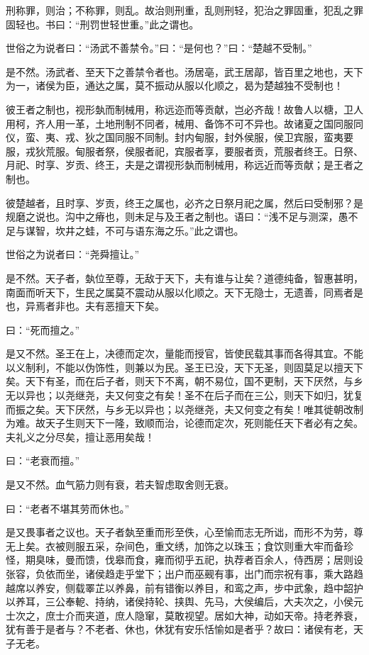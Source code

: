 \documentclass[]{article}
\begin{document}
刑称罪，则治；不称罪，则乱。故治则刑重，乱则刑轻，犯治之罪固重，犯乱之罪固轻也。书曰：``刑罚世轻世重。''此之谓也。

世俗之为说者曰：``汤武不善禁令。''曰：``是何也？''曰：``楚越不受制。''

是不然。汤武者、至天下之善禁令者也。汤居亳，武王居鄗，皆百里之地也，天下为一，诸侯为臣，通达之属，莫不振动从服以化顺之，曷为楚越独不受制也！

彼王者之制也，视形埶而制械用，称远迩而等贡献，岂必齐哉！故鲁人以榶，卫人用柯，齐人用一革，土地刑制不同者，械用、备饰不可不异也。故诸夏之国同服同仪，蛮、夷、戎、狄之国同服不同制。封内甸服，封外侯服，侯卫宾服，蛮夷要服，戎狄荒服。甸服者祭，侯服者祀，宾服者享，要服者贡，荒服者终王。日祭、月祀、时享、岁贡、终王，夫是之谓视形埶而制械用，称远近而等贡献；是王者之制也。

彼楚越者，且时享、岁贡，终王之属也，必齐之日祭月祀之属，然后曰受制邪？是规磨之说也。沟中之瘠也，则未足与及王者之制也。语曰：``浅不足与测深，愚不足与谋智，坎井之蛙，不可与语东海之乐。''此之谓也。

世俗之为说者曰：``尧舜擅让。''

是不然。天子者，埶位至尊，无敌于天下，夫有谁与让矣？道德纯备，智惠甚明，南面而听天下，生民之属莫不震动从服以化顺之。天下无隐士，无遗善，同焉者是也，异焉者非也。夫有恶擅天下矣。

曰：``死而擅之。''

是又不然。圣王在上，决德而定次，量能而授官，皆使民载其事而各得其宜。不能以义制利，不能以伪饰性，则兼以为民。圣王已没，天下无圣，则固莫足以擅天下矣。天下有圣，而在后子者，则天下不离，朝不易位，国不更制，天下厌然，与乡无以异也；以尧继尧，夫又何变之有矣！圣不在后子而在三公，则天下如归，犹复而振之矣。天下厌然，与乡无以异也；以尧继尧，夫又何变之有矣！唯其徙朝改制为难。故天子生则天下一隆，致顺而治，论德而定次，死则能任天下者必有之矣。夫礼义之分尽矣，擅让恶用矣哉！

曰：``老衰而擅。''

是又不然。血气筋力则有衰，若夫智虑取舍则无衰。

曰：``老者不堪其劳而休也。''

是又畏事者之议也。天子者埶至重而形至佚，心至愉而志无所诎，而形不为劳，尊无上矣。衣被则服五采，杂间色，重文绣，加饰之以珠玉；食饮则重大牢而备珍怪，期臭味，曼而馈，伐皋而食，雍而彻乎五祀，执荐者百余人，侍西房；居则设张容，负依而坐，诸侯趋走乎堂下；出户而巫觋有事，出门而宗祝有事，乘大路趋越席以养安，侧载睪芷以养鼻，前有错衡以养目，和鸾之声，步中武象，趋中韶护以养耳，三公奉軶、持纳，诸侯持轮、挟舆、先马，大侯编后，大夫次之，小侯元士次之，庶士介而夹道，庶人隐窜，莫敢视望。居如大神，动如天帝。持老养衰，犹有善于是者与？不老者、休也，休犹有安乐恬愉如是者乎？故曰：诸侯有老，天子无老。
\end{document}
